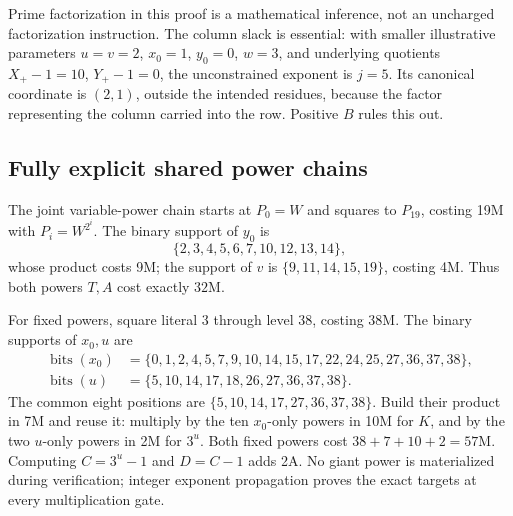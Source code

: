 \documentclass[11pt,letterpaper]{article}
\theoremstyle{definition}\newtheorem{definition}[theorem]{Definition}
\theoremstyle{remark}\newtheorem{remark}[theorem]{Remark}
\begin{document}
Prime factorization in this proof is a mathematical inference, not an uncharged factorization instruction. The column slack is essential: with smaller illustrative parameters $u=v=2$, $x_0=1$, $y_0=0$, $w=3$, and underlying quotients $X_+-1=10$, $Y_+-1=0$, the unconstrained exponent is $j=5$. Its canonical coordinate is $(2,1)$, outside the intended residues, because the factor representing the column carried into the row. Positive $B$ rules this out.

\subsection{Fully explicit shared power chains}
The joint variable-power chain starts at $P_0=W$ and squares to $P_{19}$, costing 19M with $P_i=W^{2^i}$. The binary support of $y_0$ is
\[
\{2,3,4,5,6,7,10,12,13,14\},
\]
whose product costs 9M; the support of $v$ is $\{9,11,14,15,19\}$, costing 4M. Thus both powers $T,A$ cost exactly $32$M.

For fixed powers, square literal 3 through level 38, costing 38M. The binary supports of $x_0,u$ are
\begin{align*}
\operatorname{bits}(x_0)&=\{0,1,2,4,5,7,9,10,14,15,17,22,24,25,27,36,37,38\},\\
\operatorname{bits}(u)&=\{5,10,14,17,18,26,27,36,37,38\}.
\end{align*}
The common eight positions are $\{5,10,14,17,27,36,37,38\}$. Build their product in 7M and reuse it: multiply by the ten $x_0$-only powers in 10M for $K$, and by the two $u$-only powers in 2M for $3^u$. Both fixed powers cost $38+7+10+2=57$M. Computing $C=3^u-1$ and $D=C-1$ adds 2A. No giant power is materialized during verification; integer exponent propagation proves the exact targets at every multiplication gate.
\end{document}
